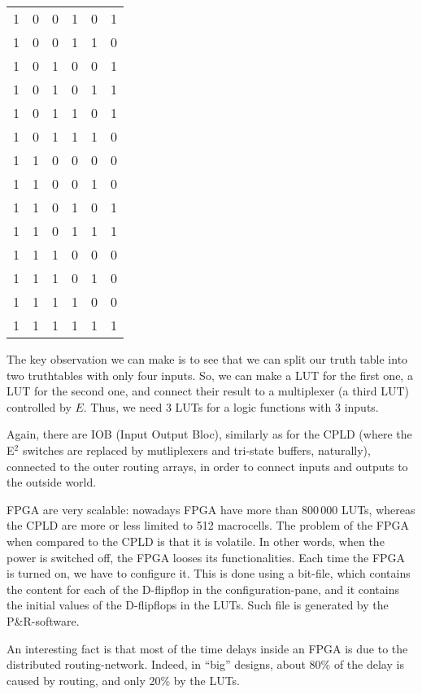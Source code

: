 \documentclass[a4paper]{article}
\begin{document}
{\begin{center}
\begin{tabular}{ccccc|c}
            1 & 0 & 0 & 1 & 0 & 1 \\
            1 & 0 & 0 & 1 & 1 & 0 \\
            1 & 0 & 1 & 0 & 0 & 1 \\
            1 & 0 & 1 & 0 & 1 & 1 \\
            1 & 0 & 1 & 1 & 0 & 1 \\
            1 & 0 & 1 & 1 & 1 & 0 \\
            1 & 1 & 0 & 0 & 0 & 0 \\
            1 & 1 & 0 & 0 & 1 & 0 \\
            1 & 1 & 0 & 1 & 0 & 1 \\
            1 & 1 & 0 & 1 & 1 & 1 \\
            1 & 1 & 1 & 0 & 0 & 0 \\
            1 & 1 & 1 & 0 & 1 & 0 \\
            1 & 1 & 1 & 1 & 0 & 0 \\
            1 & 1 & 1 & 1 & 1 & 1 \\
        \end{tabular}
    \end{center}

    The key observation we can make is to see that we can split our truth table into two truthtables with only four inputs. So, we can make a LUT for the first one, a LUT for the second one, and connect their result to a multiplexer (a third LUT) controlled by $E$. Thus, we need 3 LUTs for a logic functions with 3 inputs.

    Again, there are IOB (Input Output Bloc), similarly as for the CPLD (where the E$^2$ switches are replaced by mutliplexers and tri-state buffers, naturally), connected to the outer routing arrays, in order to connect inputs and outputs to the outside world.
    
    FPGA are very scalable: nowadays FPGA have more than $800\,000$ LUTs, whereas the CPLD are more or less limited to 512 macrocells. The problem of the FPGA when compared to the CPLD is that it is volatile. In other words, when the power is switched off, the FPGA looses its functionalities. Each time the FPGA is turned on, we have to configure it. This is done using a bit-file, which contains the content for each of the D-flipflop in the configuration-pane, and it contains the initial values of the D-flipflops in the LUTs. Such file is generated by the P\&R-software.

    An interesting fact is that most of the time delays inside an FPGA is due to the distributed routing-network. Indeed, in ``big'' designs, about 80\% of the delay is caused by routing, and only 20\% by the LUTs.
}
\end{document}
